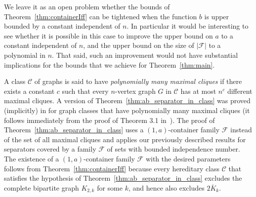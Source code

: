 \documentclass[11pt]{amsart}
\newtheorem{theorem}{Theorem}[section]
\newcommand{\cal}{\mathcal}
\begin{document}

We leave it as an open problem whether the bounds of Theorem~\ref{thm:containerIff} can be tightened 
when the function $b$ is upper bounded by a constant independent of $n$. In particular it would be interesting to see whether it is possible in this case to improve the upper bound on $a$ to a constant independent of $n$, and the upper bound on the size of $|{\cal F}|$ to a polynomial in $n$.
That said, such an improvement would not have substantial implications for the bounds that we achieve for Theorem~\ref{thm:main}. %

A class ${\cal C}$ of graphs is said to have {\em polynomially many maximal cliques} if there exists a constant $c$ such that every $n$-vertex graph $G$ in ${\cal C}$ has at most $n^c$ different maximal cliques. A version of Theorem~\ref{thm:ab_separator_in_class} 
was proved (implicitly) in \cite{ChudnovskyGHLS25} for graph classes that have polynomially many maximal cliques (it  follows immediately from the proof of Theorem 3.1 in~\cite{ChudnovskyGHLS25}).  The proof of  Theorem~\ref{thm:ab_separator_in_class} 
uses a $(1, a)$-container family ${\cal F}$ instead of the set of all maximal cliques and applies our previously described results  for separators covered by a family ${\cal F}$ of sets with bounded independence number. The existence of a  $(1, a)$-container family ${\cal F}$ with the desired parameters follows  from Theorem~\ref{thm:containerIff} because every hereditary class ${\cal C}$ that satisfies the hypothesis of Theorem~\ref{thm:ab_separator_in_class} excludes the complete bipartite graph  $K_{2,k}$ for some $k$, and hence also excludes $\overline{2K_k}$. 
\end{document}

